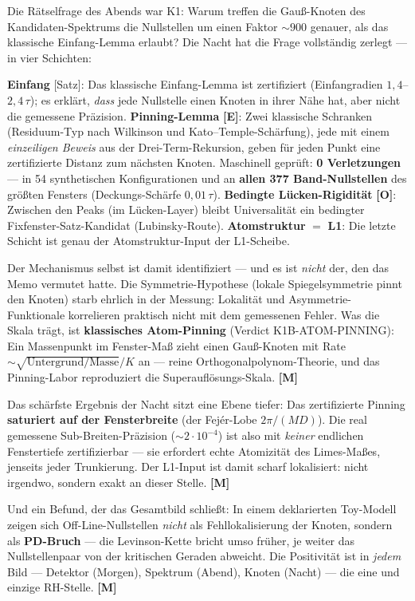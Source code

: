 \documentclass[11pt,a4paper]{article}
\newcommand{\E}{\textcolor{gut}{\textbf{[E]}}}
\newcommand{\OO}{\textcolor{offen}{\textbf{[O]}}}
\newcommand{\M}{\textcolor{mess}{\textbf{[M]}}}
\begin{document}
Die Rätselfrage des Abends war K1: Warum treffen die Gauß-Knoten
des Kandidaten-Spektrums die Nullstellen um einen Faktor
$\sim 900$ genauer, als das klassische Einfang-Lemma erlaubt? Die
Nacht hat die Frage vollständig zerlegt --- in vier Schichten:

\textbf{Einfang} [Satz]: Das klassische Einfang-Lemma ist
zertifiziert (Einfangradien $1{,}4$--$2{,}4\,\tau$); es erklärt,
\emph{dass} jede Nullstelle einen Knoten in ihrer Nähe hat, aber
nicht die gemessene Präzision. \textbf{Pinning-Lemma} \E{}: Zwei
klassische Schranken (Residuum-Typ nach Wilkinson und
Kato--Temple-Schärfung), jede mit einem \emph{einzeiligen Beweis}
aus der Drei-Term-Rekursion, geben für jeden Punkt eine
zertifizierte Distanz zum nächsten Knoten. Maschinell geprüft:
\textbf{0 Verletzungen} --- in 54 synthetischen Konfigurationen
und an \textbf{allen 377 Band-Nullstellen} des größten Fensters
(Deckungs-Schärfe $0{,}01\,\tau$). \textbf{Bedingte
Lücken-Rigidität} \OO{}: Zwischen den Peaks (im
\glqq{}Lücken-Layer\grqq{}) bleibt Universalität ein bedingter
Fixfenster-Satz-Kandidat (Lubinsky-Route). \textbf{Atomstruktur}
$=$ \textbf{L1}: Die letzte Schicht ist genau der
Atomstruktur-Input der L1-Scheibe.

Der Mechanismus selbst ist damit identifiziert --- und es ist
\emph{nicht} der, den das Memo vermutet hatte. Die
Symmetrie-Hypothese (lokale Spiegelsymmetrie pinnt den Knoten)
starb ehrlich in der Messung: Lokalität und Asymmetrie-Funktionale
korrelieren praktisch nicht mit dem gemessenen Fehler. Was die
Skala trägt, ist \textbf{klassisches Atom-Pinning} (Verdict
K1B-ATOM-PINNING): Ein Massenpunkt im Fenster-Maß zieht einen
Gauß-Knoten mit Rate $\sim \sqrt{\mathrm{Untergrund}/\mathrm{Masse}}/K$
an --- reine Orthogonalpolynom-Theorie, und das Pinning-Labor
reproduziert die Superauflösungs-Skala. \M{}

Das schärfste Ergebnis der Nacht sitzt eine Ebene tiefer: Das
zertifizierte Pinning \textbf{saturiert auf der Fensterbreite}
(der Fejér-Lobe $2\pi/(MD)$). Die real gemessene
Sub-Breiten-Präzision ($\sim 2 \cdot 10^{-4}$) ist also mit
\emph{keiner} endlichen Fenstertiefe zertifizierbar --- sie
erfordert echte Atomizität des Limes-Maßes, jenseits jeder
Trunkierung. Der L1-Input ist damit scharf lokalisiert: nicht
irgendwo, sondern exakt an dieser Stelle. \M{}

Und ein Befund, der das Gesamtbild schließt: In einem deklarierten
Toy-Modell zeigen sich Off-Line-Nullstellen \emph{nicht} als
Fehllokalisierung der Knoten, sondern als \textbf{PD-Bruch} ---
die Levinson-Kette bricht umso früher, je weiter das
Nullstellenpaar von der kritischen Geraden abweicht. Die
Positivität ist in \emph{jedem} Bild --- Detektor (Morgen),
Spektrum (Abend), Knoten (Nacht) --- die eine und einzige
RH-Stelle. \M{}
\end{document}
